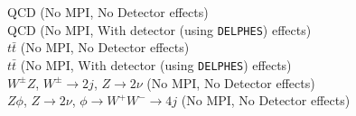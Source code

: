 QCD (No MPI, No Detector effects)\\


QCD (No MPI, With detector (using {\tt DELPHES}) effects)\\



$t \bar{t}$ (No MPI, No Detector effects)\\


$t \bar{t}$ (No MPI, With detector (using {\tt DELPHES}) effects)\\



$W^{\pm}Z$, $W^{\pm} \rightarrow 2j$, $Z \rightarrow 2\nu$ (No MPI, No Detector effects)\\




$Z \phi$, $Z \rightarrow 2 \nu$, $\phi \rightarrow W^+ W^- \rightarrow 4j$ (No MPI, No Detector effects)\\
